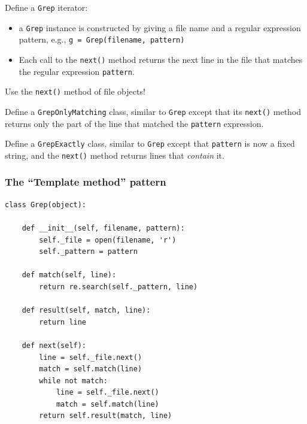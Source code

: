 \documentclass[english,serif,mathserif,xcolor=pdftex,dvipsnames,table]{beamer}
\begin{document}
\begin{frame}[fragile]
  \begin{exercise}
    Define a \texttt{Grep} iterator:
    \begin{itemize}
    \item a \texttt{Grep} instance is constructed by giving a file name and a regular expression pattern, e.g., \lstinline|g = Grep(filename, pattern)|
    \item Each call to the \texttt{next()} method returns the next line in the file that matches the regular expression \texttt{pattern}.
    \end{itemize}

    Use the \texttt{next()} method of file objects!
  \end{exercise}

  \+
  \begin{exercise}
    Define a \texttt{GrepOnlyMatching} class, similar to \texttt{Grep}
    except that its \texttt{next()} method returns only the part of
    the line that matched the \texttt{pattern} expression.
  \end{exercise}

  \+
  \begin{exercise}
    Define a \texttt{GrepExactly} class, similar to \texttt{Grep}
    except that \texttt{pattern} is now a fixed string, and the
    \texttt{next()} method returns lines that \emph{contain} it.
  \end{exercise}
\end{frame}


\begin{frame}[fragile]
  \frametitle{The ``Template method'' pattern}
\begin{lstlisting}
class Grep(object):

    def __init__(self, filename, pattern):
        self._file = open(filename, 'r')
        self._pattern = pattern

    def match(self, line):
        return re.search(self._pattern, line)

    def result(self, match, line):
        return line

    def next(self):
        line = self._file.next()
        match = self.match(line)
        while not match:
            line = self._file.next()
            match = self.match(line)
        return self.result(match, line)
\end{lstlisting}
\end{frame}
\end{document}
